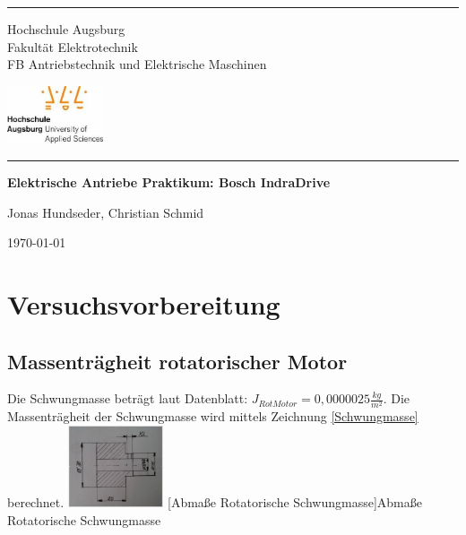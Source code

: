 \documentclass[10pt,a4paper,oneside,abstracton]{scrartcl}
\begin{document}
\begin{titlepage}
\par\noindent\rule{\textwidth}{0.4pt}

\noindent\begin{minipage}{0.5\textwidth}%
		Hochschule Augsburg  \\ 
	Fakultät Elektrotechnik \\
	FB Antriebstechnik und Elektrische Maschinen
	\end{minipage}%
	\hfill%
	\begin{minipage}{0.5\textwidth}\raggedleft
		\includegraphics[width=80pt]{./Bilder/hsLogo.jpeg}	
	\end{minipage}

	\par\noindent\rule{\textwidth}{0.4pt}
	\centering
	\vspace*{\fill}

    \vspace*{0.5cm}

    \huge\bfseries
    Elektrische Antriebe Praktikum:
	\newline 
	Bosch IndraDrive

    \vspace*{0.5cm}

    \large Jonas Hundseder, Christian Schmid
	
    \vspace*{\fill}
	\today
\end{titlepage}

\tableofcontents
\clearpage


\section{Versuchsvorbereitung}
\subsection{Massenträgheit rotatorischer Motor}
Die Schwungmasse beträgt laut Datenblatt: 
$ J_{Rot Motor} = 0,000 002 5 \frac{kg}{m^2}$. 
\newline
Die Massenträgheit der Schwungmasse wird mittels Zeichnung \ref*{Schwungmasse} berechnet.
	\includegraphics[width=80pt]{./Bilder/Rot_Masse.png}
[Abmaße Rotatorische Schwungmasse]{Abmaße Rotatorische Schwungmasse \label{Schwungmasse}} 
\end{document}
